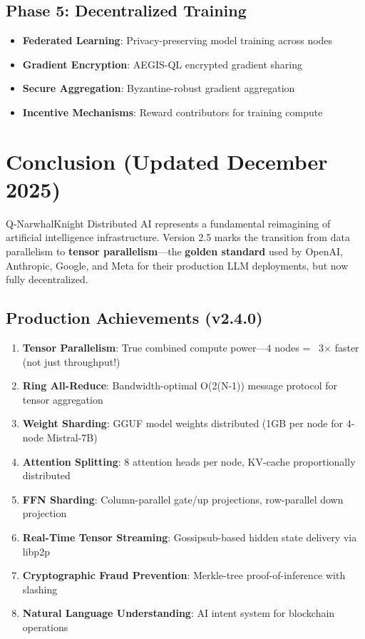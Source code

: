 \documentclass[11pt,a4paper]{article}
\begin{document}
\subsection{Phase 5: Decentralized Training}

\begin{itemize}
    \item \textbf{Federated Learning}: Privacy-preserving model training across nodes
    \item \textbf{Gradient Encryption}: AEGIS-QL encrypted gradient sharing
    \item \textbf{Secure Aggregation}: Byzantine-robust gradient aggregation
    \item \textbf{Incentive Mechanisms}: Reward contributors for training compute
\end{itemize}

\newpage
\section{Conclusion (Updated December 2025)}

Q-NarwhalKnight Distributed AI represents a fundamental reimagining of artificial intelligence infrastructure. Version 2.5 marks the transition from data parallelism to \textbf{tensor parallelism}---the \textbf{golden standard} used by OpenAI, Anthropic, Google, and Meta for their production LLM deployments, but now fully decentralized.

\subsection{Production Achievements (v2.4.0)}

\begin{enumerate}
    \item \textbf{Tensor Parallelism}: True combined compute power---4 nodes = ~3$\times$ faster (not just throughput!)
    \item \textbf{Ring All-Reduce}: Bandwidth-optimal O(2(N-1)) message protocol for tensor aggregation
    \item \textbf{Weight Sharding}: GGUF model weights distributed (1GB per node for 4-node Mistral-7B)
    \item \textbf{Attention Splitting}: 8 attention heads per node, KV-cache proportionally distributed
    \item \textbf{FFN Sharding}: Column-parallel gate/up projections, row-parallel down projection
    \item \textbf{Real-Time Tensor Streaming}: Gossipsub-based hidden state delivery via libp2p
    \item \textbf{Cryptographic Fraud Prevention}: Merkle-tree proof-of-inference with slashing
    \item \textbf{Natural Language Understanding}: AI intent system for blockchain operations
\end{enumerate}
\end{document}
